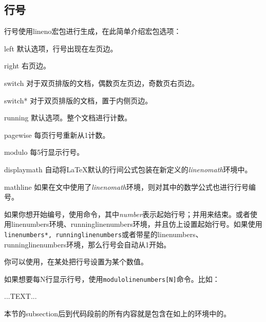 \subsection{行号}
\begin{linenumbers}
\modulolinenumbers[3]
行号使用lineno宏包进行生成，在此简单介绍宏包选项：
\begin{para}
  \item[left]默认选项，行号出现在左页边。
  \item[right]右页边。
  \item[switch]对于双页排版的文档，偶数页左页边，奇数页右页边。
  \item[switch*]对于双页排版的文档，置于内侧页边。
  \item[running]默认选项。整个文档进行计数。
  \item[pagewise]每页行号重新从1计数。
  \item[modulo]每5行显示行号。
  \item[displaymath]自动将\LaTeX 默认的行间公式包装在新定义的\textit{linenomath}环境中。
  \item[mathline]如果在文中使用了\textit{linenomath}环境，则对其中的数学公式也进行行号编号。
\end{para}

如果你想开始编号，使用\latexline{\\linenumbers[number]}命令，其中\textit{number}表示起始行号；并用\latexline{\\nolinenumbers}来结束。或者使用linenumbers环境、runninglinenumbers环境，并且仿上设置起始行号。如果使用\texttt{ linenumbers*, runninglinenumbers}或者带星的linenumbers、runninglinenumbers环境，那么行号会自动从1开始。

你可以使用\latexline{\\resetlinenumber[number]}，在某处把行号设置为某个数值。

如果想要每N行显示行号，使用\texttt{modulolinenumbers[N]}命令。比如：
\end{linenumbers}

\begin{latex}{}
\begin{linenumbers}
  \modulolinenumbers[3]
  ...TEXT...
\end{linenumbers}
\end{latex}

本节的subsection后到代码段前的所有内容就是包含在如上的环境中的。

%

